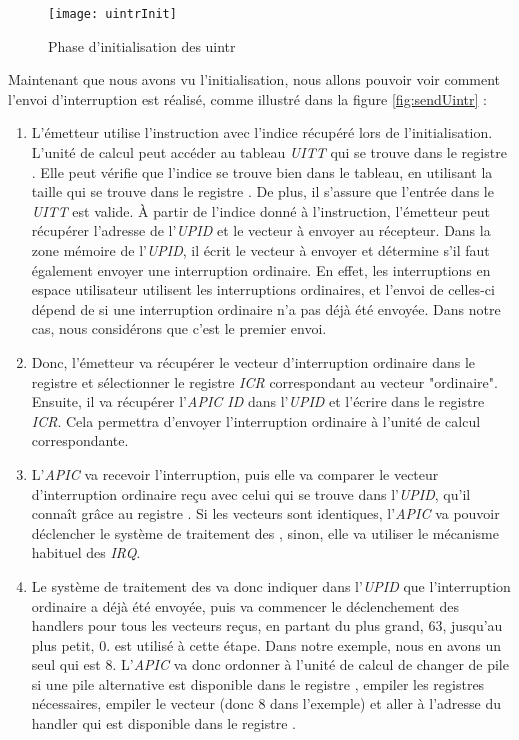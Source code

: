 \begin{figure}[H]
  \texttt{[image: uintrInit]}
  \caption{Phase d'initialisation des uintr}
  \label{fig:initUintr}
\end{figure}

Maintenant que nous avons vu l'initialisation, nous allons pouvoir voir comment l'envoi d'interruption est réalisé, comme illustré dans la figure \ref{fig:sendUintr} :

\begin{enumerate}[label=\protect\circled{\arabic*}]
  \item L'émetteur utilise l'instruction  avec l'indice récupéré lors de l'initialisation.
  L'unité de calcul peut accéder au tableau \emph{UITT} qui se trouve dans le registre .
  Elle peut vérifie que l'indice se trouve bien dans le tableau, en utilisant la taille qui se trouve dans le registre .
  De plus, il s'assure que l'entrée dans le \emph{UITT} est valide.
  À partir de l'indice donné à l'instruction, l'émetteur peut récupérer l'adresse de l'\emph{UPID} et le vecteur \uintr{} à envoyer au récepteur.
  Dans la zone mémoire de l'\emph{UPID}, il écrit le vecteur \uintr{} à envoyer et détermine s'il faut également envoyer une interruption ordinaire.
  En effet, les interruptions en espace utilisateur utilisent les interruptions ordinaires,
  et l'envoi de celles-ci dépend de si une interruption ordinaire n'a pas déjà été envoyée.
  Dans notre cas, nous considérons que c'est le premier envoi.
  \item Donc, l'émetteur va récupérer le vecteur d'interruption ordinaire dans le registre  et
  sélectionner le registre \emph{ICR} correspondant au vecteur "ordinaire".
  Ensuite, il va récupérer l'\emph{APIC ID} dans l'\emph{UPID} et l'écrire dans le registre \emph{ICR}.
  Cela permettra d'envoyer l'interruption ordinaire à l'unité de calcul correspondante.
  \item L'\emph{APIC} va recevoir l'interruption, puis elle va comparer le vecteur d'interruption ordinaire reçu avec celui qui se trouve dans l'\emph{UPID}, qu'il connaît grâce au registre .
  Si les vecteurs sont identiques, l'\emph{APIC} va pouvoir déclencher le système de traitement des \uintr{}, sinon, elle va utiliser le mécanisme habituel des \emph{IRQ}.

  \item Le système de traitement des \uintr{} va donc indiquer dans l'\emph{UPID} que l'interruption ordinaire a déjà été envoyée,
  puis va commencer le déclenchement des handlers pour tous les vecteurs \uintr{} reçus, en partant du plus grand, 63, jusqu'au plus petit, 0.
   est utilisé à cette étape.
  Dans notre exemple, nous en avons un seul qui est 8.
  L'\emph{APIC} va donc ordonner à l'unité de calcul de changer de pile si une pile alternative est disponible dans
  le registre , empiler les registres nécessaires, empiler le vecteur \uintr{} (donc 8 dans l'exemple) et aller à l'adresse du handler qui est disponible dans le registre .
\end{enumerate}

